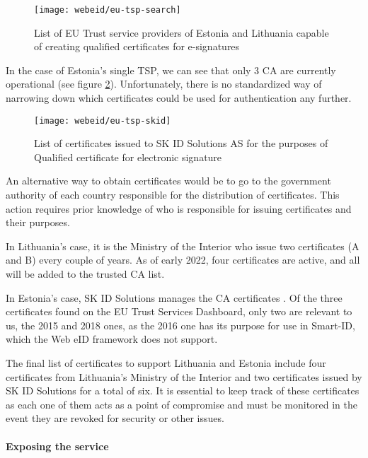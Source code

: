 \begin{figure}
  \centering
  \texttt{[image: webeid/eu-tsp-search]}
  \caption{List of EU Trust service providers of Estonia and Lithuania capable of creating qualified certificates for e-signatures}
  \label{fig:eu-tsp-list}
\end{figure}

In the case of Estonia's single TSP, we can see that only 3 CA are currently operational (see figure \ref{fig:eu-tsp-skid}). Unfortunately, there is no standardized way of narrowing down which certificates could be used for authentication any further.

\begin{figure}
  \centering
  \texttt{[image: webeid/eu-tsp-skid]}
  \caption{List of certificates issued to SK ID Solutions AS for the purposes of Qualified certificate for electronic signature}
  \label{fig:eu-tsp-skid}
\end{figure}

An alternative way to obtain certificates would be to go to the government authority of each country responsible for the distribution of certificates. This action requires prior knowledge of who is responsible for issuing certificates and their purposes.

In Lithuania's case, it is the Ministry of the Interior \cite{eid-lt-ministryofinterior-certificates} who issue two certificates (A and B) every couple of years. As of early 2022, four certificates are active, and all will be added to the trusted CA list.

In Estonia's case, SK ID Solutions manages the CA certificates \cite{eid-ee-skid-certificates}. Of the three certificates found on the EU Trust Services Dashboard, only two are relevant to us, the 2015 and 2018 ones, as the 2016 one has its purpose for use in Smart-ID, which the Web eID framework does not support.

The final list of certificates to support Lithuania and Estonia include four certificates from Lithuania's Ministry of the Interior and two certificates issued by SK ID Solutions for a total of six. It is essential to keep track of these certificates as each one of them acts as a point of compromise and must be monitored in the event they are revoked for security \cite{roca-vulnerability-lessons-learned} or other issues.

\paragraph{Exposing the service}

